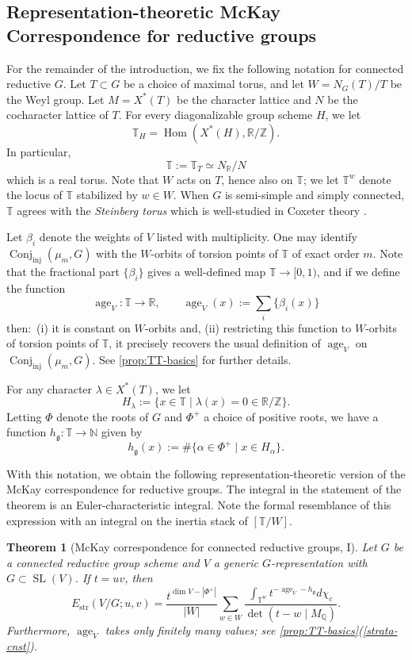 \documentclass[12pt,a4paper]{amsart}
\newtheorem{theorem}{Theorem}
\theoremstyle{definition}
\newcommand{\TT}{\mathbb T}
\newcommand{\ZZ}{\mathbb{Z}}
\newcommand{\NN}{\mathbb{N}}
\newcommand{\QQ}{\mathbb{Q}}
\newcommand{\RR}{\mathbb{R}}
\newcommand{\g}{\mathfrak{g}}
\newcommand{\str}{\mathrm{str}}
\renewcommand{\1}{\textbf{1}}
\newcommand{\<}{\langle}
\renewcommand{\>}{\rangle}
\DeclareMathOperator{\age}{age}
\DeclareMathOperator{\Hom}{Hom}
\DeclareMathOperator{\SL}{SL}
\DeclareMathOperator{\Conj}{Conj}
\DeclareMathOperator{\inj}{inj}
\begin{document}
\subsection{Representation-theoretic McKay Correspondence for reductive groups}

For the remainder of the introduction, we fix the following notation for connected reductive $G$. Let $T\subset G$ be a choice of maximal torus, and let $W=N_G(T)/T$ be the Weyl group. Let $M=X^*(T)$ be the character lattice and $N$ be the cocharacter lattice of $T$. For every diagonalizable group scheme $H$, we let
\[
	\TT_H=\Hom(X^*(H),\RR/\ZZ).
\]
In particular, 
\[
	\TT:=\TT_T\simeq N_\RR/N
\]
which is a real torus. Note that $W$ acts on $T$, hence also on $\TT$; we let $\TT^w$ denote the locus of $\TT$ stabilized by $w\in W$. When $G$ is semi-simple and simply connected, $\TT$ agrees with the \emph{Steinberg torus} which is well-studied in Coxeter theory \cite{DilksPetersenStembridge2009,AguiarPetersen2015}.

Let $\beta_i$ denote the weights of $V$ listed with multiplicity. One may identify $\Conj_{\inj}(\mu_m,G)$ with the $W$-orbits of torsion points of $\TT$ of exact order $m$. Note that the fractional part $\{\beta_i\}$ gives a well-defined map $\TT\to[0,1)$, and if we define the function
\[
	\age_V\colon\TT\to\RR,\qquad \age_V(x):=\sum_i\{\beta_i(x)\}
\]
then:~(i) it is constant on $W$-orbits and, (ii) restricting this function to $W$-orbits of torsion points of $\TT$, it precisely recovers the usual definition of $\age_V$ on $\Conj_{\inj}(\mu_m,G)$. See \autoref{prop:TT-basics} for further details.

For any character $\lambda\in X^*(T)$, we let 
\[
	H_\lambda:=\{x\in\TT\mid \lambda(x)=0\in\RR/\ZZ\}.
\]
Letting $\Phi$ denote the roots of $G$ and $\Phi^+$ a choice of positive roots, we have a function $h_\g\colon\TT\to\NN$ given by
\[
	h_\g(x):=\#\{\alpha\in\Phi^+\mid x\in H_\alpha\}.
\]

With this notation, we obtain the following representation-theoretic version of the McKay correspondence for reductive groups. The integral in the statement of the theorem is an Euler-characteristic integral. Note the formal resemblance of this expression with an integral on the inertia stack of $[\TT/W]$.

\begin{theorem}[{McKay correspondence for connected reductive groups, I}]\label{thm:main-McKay-connected-reductive}
Let $G$ be a connected reductive group scheme and $V$ a generic $G$-representation with $G\subset\SL(V)$. If $t=uv$, then
\[
	E_{\str}(V/G;u,v)=\frac{t^{\dim V-|\Phi^+|}}{|W|}\sum_{w\in W}\frac{\int_{\TT^w}t^{-\age_V-h_\g} d\chi_c}{\det(t-w\mid M_\QQ)}.
\]
Furthermore, $\age_V$ takes only finitely many values; see \autoref{prop:TT-basics}(\ref{strata-cnst}).
\end{theorem}
\end{document}
